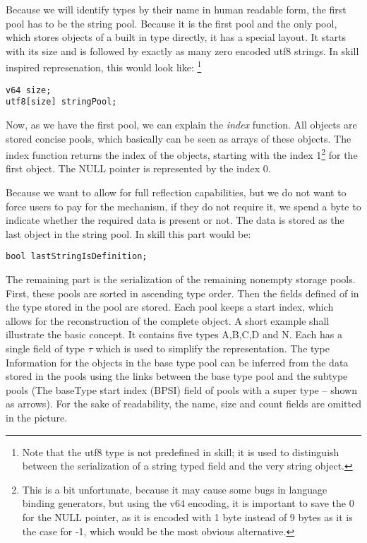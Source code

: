 \documentclass[a4paper,10pt]{article}
\begin{document}
Because we will identify types by their name in human readable form, the first pool has to be the string pool. Because it is the first pool and the only pool, which stores objects of a built in type directly, it has a special layout. It starts with its size and is followed by exactly as many zero encoded utf8 strings. In skill inspired represenation, this would look like: \footnote{Note that the utf8 type is not predefined in skill; it is used to distinguish between the serialization of a string typed field and the very string object.}
\begin{verbatim}
v64 size;
utf8[size] stringPool;
\end{verbatim}

Now, as we have the first pool, we can explain the \textit{index} function. All objects are stored concise pools, which basically can be seen as arrays of these objects. The index function returns the index of the objects, starting with the index 1\footnote{This is a bit unfortunate, because it may cause some bugs in language binding generators, but using the v64 encoding, it is important to save the 0 for the NULL pointer, as it is encoded with 1 byte instead of 9 bytes as it is the case for -1, which would be the most obvious alternative.} for the first object. The NULL pointer is represented by the index 0.

Because we want to allow for full reflection capabilities, but we do not want to force users to pay for the mechanism, if they do not require it, we spend a byte to indicate whether the required data is present or not. The data is stored as the last object in the string pool. In skill this part would be:
\begin{verbatim}
bool lastStringIsDefinition;
\end{verbatim}

The remaining part is the serialization of the remaining nonempty storage pools. First, these pools are sorted in ascending type order. Then the fields defined of in the type stored in the pool are stored. Each pool keeps a start index, which allows for the reconstruction of the complete object. A short example shall illustrate the basic concept. It contains five types A,B,C,D and N. Each has a single field of type $\tau$ which is used to simplify the representation. The type Information for the objects in the base type pool can be inferred from the data stored in the pools using the links between the base type pool and the subtype pools (The \gls{baseType} start index (BPSI) field of pools with a super type -- shown as arrows). For the sake of readability, the name, size and count fields are omitted in the picture.
\end{document}

